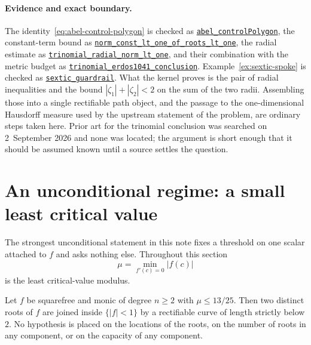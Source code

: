 \documentclass[11pt]{article}
\begin{document}
\paragraph{Evidence and exact boundary.}
\label{bdry:trinomial}
The identity~\eqref{eq:abel-control-polygon} is checked as
\href{https://github.com/wcook04/plectis-erdos/blob/0ba585f632fbbbb43af2ee9532d4e83752af3f67/ErdosProblems/Erdos1041/AbelControlPolygon.lean\#L123}{\texttt{abel\_controlPolygon}}, the
constant-term bound as
\href{https://github.com/wcook04/plectis-erdos/blob/0ba585f632fbbbb43af2ee9532d4e83752af3f67/ErdosProblems/Erdos1041/AbelControlPolygon.lean\#L258}{\texttt{norm\_const\_lt\_one\_of\_roots\_lt\_one}},
the radial estimate as
\href{https://github.com/wcook04/plectis-erdos/blob/0ba585f632fbbbb43af2ee9532d4e83752af3f67/ErdosProblems/Erdos1041/AbelControlPolygon.lean\#L219}{\texttt{trinomial\_radial\_norm\_lt\_one}},
and their combination with the metric budget as
\href{https://github.com/wcook04/plectis-erdos/blob/0ba585f632fbbbb43af2ee9532d4e83752af3f67/ErdosProblems/Erdos1041/AbelControlPolygon.lean\#L330}{\texttt{trinomial\_erdos1041\_conclusion}}.
Example~\ref{ex:sextic-spoke} is checked as
\href{https://github.com/wcook04/plectis-erdos/blob/0ba585f632fbbbb43af2ee9532d4e83752af3f67/ErdosProblems/Erdos1041/AbelControlPolygon.lean\#L555}{\texttt{sextic\_guardrail}}.  What the
kernel proves is the pair of radial inequalities and the bound
$|\zeta_1|+|\zeta_2|<2$ on the sum of the two radii.  Assembling those into a
single rectifiable path object, and the passage to the one-dimensional
Hausdorff measure used by the upstream statement of the problem, are ordinary
steps taken here.  Prior art for the trinomial conclusion was searched on
2~September 2026 and none was located; the argument is short enough that it
should be assumed known until a source settles the question.

\section{An unconditional regime: a small least critical value}
\label{sec:low-critical-closure}

The strongest unconditional statement in this note fixes a threshold on one
scalar attached to $f$ and asks nothing else.  Throughout this section
\[
 \mu=\min_{f'(c)=0}|f(c)|
\]
is the least critical-value modulus.

\begin{theorem}
\label{res:low-critical-thirteen-twentyfifths}
Let $f$ be squarefree and monic of degree $n\ge2$ with $\mu\le13/25$.  Then
two distinct roots of $f$ are joined inside $\{|f|<1\}$ by a rectifiable
curve of length strictly below $2$.  No hypothesis is placed on the locations
of the roots, on the number of roots in any component, or on the capacity of
any component.
\end{theorem}
\end{document}
